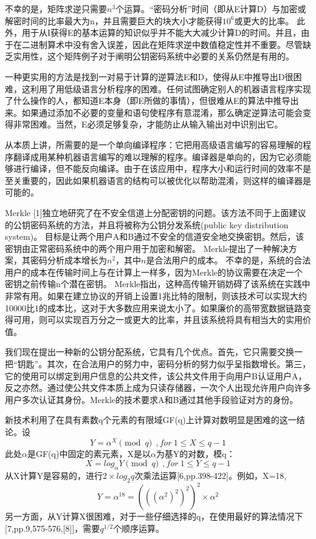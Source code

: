 \documentclass[]{article}
\begin{document}
	
	不幸的是，矩阵求逆只需要$n^3$个运算。“密码分析”时间（即从E计算D）与加密或解密时间的比率最大为n，并且需要巨大的块大小才能获得$10^6$或更大的比率。
	此外，用于从I获得E的基本运算的知识似乎并不能大大减少计算D的时间。并且，由于在二进制算术中没有舍入误差，因此在矩阵求逆中数值稳定性并不重要。尽管缺乏实用性，这个矩阵例子对于阐明公钥密码系统中必要的关系仍然是有用的。
	
	一种更实用的方法是找到一对易于计算的逆算法E和D，使得从E中推导出D很困难，这利用了用低级语言分析程序的困难。任何试图确定别人的机器语言程序实现了什么操作的人，都知道E本身（即E所做的事情），但很难从E的算法中推导出来。如果通过添加不必要的变量和语句使程序有意混淆，那么确定逆算法可能会变得非常困难。当然，E必须足够复杂，才能防止从输入输出对中识别出它。
	
	从本质上讲，所需要的是一个单向编译程序：它把用高级语言编写的容易理解的程序翻译成用某种机器语言编写的难以理解的程序。编译器是单向的，因为它必须能够进行编译，但不能反向编译。由于在该应用中，程序大小和运行时间的效率不是至关重要的，因此如果机器语言的结构可以被优化以帮助混淆，则这样的编译器是可能的。
	
	Merkle [1]独立地研究了在不安全信道上分配密钥的问题。该方法不同于上面建议的公钥密码系统的方法，并且将被称为公钥分发系统(public key distribution system)。
	目标是让两个用户A和B通过不安全的信道安全地交换密钥。然后，该密钥由正常密码系统中的两个用户用于加密和解密。
	Merkle提出了一种解决方案，其密码分析成本增长为$n^2$，其中$n$是合法用户的成本。
	不幸的是，系统的合法用户的成本在传输时间上与在计算上一样多，因为Merkle的协议需要在决定一个密钥之前传输n个潜在密钥。
	Merkle指出，这种高传输开销妨碍了该系统在实践中非常有用。如果在建立协议的开销上设置1兆比特的限制，则该技术可以实现大约10000比1的成本比，这对于大多数应用来说太小了。如果廉价的高带宽数据链路变得可用，则可以实现百万分之一或更大的比率，并且该系统将具有相当大的实用价值。
	
	
	我们现在提出一种新的公钥分配系统，它具有几个优点。首先，它只需要交换一把“钥匙”。其次，在合法用户的努力中，密码分析的努力似乎呈指数增长。第三，它的使用可以绑定到用户信息的公共文件，该公共文件用于向用户B认证用户A，反之亦然。通过使公共文件本质上成为只读存储器，一次个人出现允许用户向许多用户多次认证其身份。Merkle的技术要求A和B通过其他手段验证对方的身份。
	
	
	新技术利用了在具有素数q个元素的有限域GF(q)上计算对数明显是困难的这一结论。设
	\begin{equation}
		Y=\alpha^X \pmod{q}\ \ ,for\ 1\leq X\leq q-1
	\end{equation}
	此处$\alpha$是GF(q)中固定的素元素，X是以$\alpha$为基Y的对数，模q：
	\begin{equation}
		X=log_\alpha Y \pmod{q}\ \ ,for\ 1\leq Y\leq q-1
	\end{equation}
	从X计算Y是容易的，进行$2\times log_2 q$次乘法运算[6,pp.398-422]。例如，X=18,
	\begin{equation}
		Y=\alpha ^{18}=(((\alpha^2)^2)^2)^2 \times \alpha^2
	\end{equation}
	另一方面，从Y计算X很困难，对于一些仔细选择的q，在使用最好的算法情况下[7,pp.9,575-576,[8]]，需要$q^{1/2}$个顺序运算。
	
\end{document}
